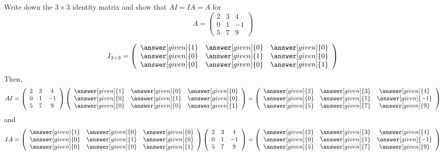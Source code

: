 \documentclass{ximera}
\begin{document}
\begin{question}
Write down the $3 \times 3$ identity matrix and show that $AI = IA = A$ for
\[A =  \left(\begin{array}{ccc}
2 & 3 & 4\\
0  & 1 & -1\\
5 & 7 & 9
\end{array}\right)
\]

\begin{prompt}
\[
I_{3\times 3} = \left(\begin{array}{ccc}
\answer[given]{1} & \answer[given]{0} & \answer[given]{0}\\
\answer[given]{0} & \answer[given]{1} & \answer[given]{0}\\
\answer[given]{0} & \answer[given]{0} & \answer[given]{1}
\end{array}\right)
\]
Then,
\[
AI = \left(\begin{array}{ccc}
2 & 3 & 4\\
0  & 1 & -1\\
5 & 7 & 9
\end{array}\right)\left(\begin{array}{ccc}
\answer[given]{1} & \answer[given]{0} & \answer[given]{0}\\
\answer[given]{0} & \answer[given]{1} & \answer[given]{0}\\
\answer[given]{0} & \answer[given]{0} & \answer[given]{1}
\end{array}\right)= \left(\begin{array}{ccc}
\answer[given]{2} & \answer[given]{3} & \answer[given]{4}\\
\answer[given]{0} & \answer[given]{1} & \answer[given]{-1}\\
\answer[given]{5} & \answer[given]{7} & \answer[given]{9}
\end{array}\right)\]
and
\[
IA = \left(\begin{array}{ccc}
\answer[given]{1} & \answer[given]{0} & \answer[given]{0}\\
\answer[given]{0} & \answer[given]{1} & \answer[given]{0}\\
\answer[given]{0} & \answer[given]{0} & \answer[given]{1}
\end{array}\right)\left(\begin{array}{ccc}
2 & 3 & 4\\
0  & 1 & -1\\
5 & 7 & 9
\end{array}\right)= \left(\begin{array}{ccc}
\answer[given]{2} & \answer[given]{3} & \answer[given]{4}\\
\answer[given]{0} & \answer[given]{1} & \answer[given]{-1}\\
\answer[given]{5} & \answer[given]{7} & \answer[given]{9}
\end{array}\right)\]
\end{prompt}
\end{question}
\end{document}
